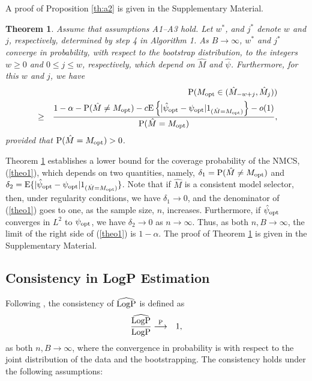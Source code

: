 \documentclass[12pt]{article} %
\newtheorem{theorem}{Theorem}
\theoremstyle{definition}
\begin{document}
A proof of Proposition \ref{th:a2} is given in the Supplementary Material.

\begin{theorem}
\label{th:nmcs}
 Assume that assumptions {\it A1}--{\it A3} hold. Let $w^{*}$, and $j^{*}$ denote $w$ and $j$, respectively, determined by step 4 in Algorithm 1.
 As $B\rightarrow\infty$, $w^{*}$ and $j^{*}$ converge in probability, with respect to the bootstrap distribution, to the integers $w\geq 0$ and $0\leq j\leq w$, respectively, which depend on $\hat{M}$ and $\hat{\psi}$. Furthermore, for this $w$ and $j$, we have
 {
\footnotesize
 \begin{eqnarray}
 &&{\rm P}(M_{\rm opt}\in(\hat{M}_{-w+j},\hat{M}_{j}))\nonumber\\
 &\geq&\frac{1-\alpha- {\rm P}(\hat{M}\neq M_{\rm opt})-c{\rm E}\left\{|\hat{\psi}_{\rm opt}-\psi_{\rm
 opt}|1_{(\hat{M}=M_{\rm opt})}\right\}-o(1)}{{\rm P}(\hat{M}=M_{\rm opt})},
\label{theo1}
 \end{eqnarray}
 }
provided that ${\rm P}(\hat{M}=M_{\rm opt})>0$.
\end{theorem}
 
 Theorem \ref{th:nmcs} establishes a lower bound for the coverage probability of the NMCS, (\ref{theo1}), which depends on two quantities, namely, $\delta_{1}={\rm P}(\hat{M}\neq M_{\rm opt})$ and $\delta_{2}={\rm E}\{|\hat{\psi}_{\rm opt}-\psi_{\rm opt}|1_{(\hat{M}=M_{\rm opt})}\}$. Note that if $\hat{M}$ is a consistent model selector, then, under regularity conditions, we have $\delta_{1}\rightarrow 0$, and the denominator of (\ref{theo1}) goes to one, as the sample size, $n$, increases. Furthermore, if $\hat{\psi}_{\rm opt}$ converges in $L^2$ to $\psi_{\rm opt}$, we have $\delta_{2}\rightarrow 0$ as $n\rightarrow\infty$. Thus, as both $n, B\rightarrow\infty$, the limit of the right side of (\ref{theo1}) is $1-\alpha$. The proof of Theorem \ref{th:nmcs} is given in the Supplementary Material. 
 \subsection{Consistency in LogP Estimation}
 \hspace{4mm}
Following \citet{Liu2021}, the consistency of $\widehat{\rm LogP}$ is defined as
 \begin{eqnarray}
 \frac{\widehat{\rm LogP}}{\rm LogP}&\stackrel{\rm P}{\longrightarrow}&1, \label{LogPc}
 \end{eqnarray}
 as both $n, B\rightarrow\infty$, where the convergence in probability is with respect to the
 joint distribution of the data and the bootstrapping. The consistency holds under the following assumptions:
 
\end{document}
